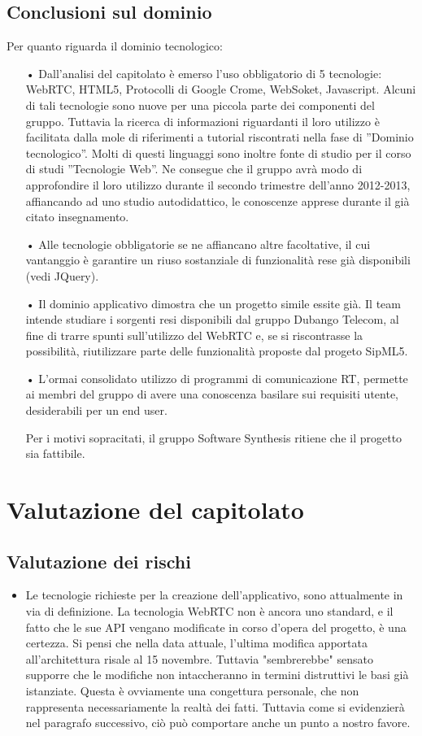 \subsection{Conclusioni sul dominio}
Per quanto riguarda il dominio tecnologico:
\begin{itemize}
	\item[•] Dall'analisi del capitolato è emerso l'uso obbligatorio di 5 tecnologie: WebRTC, HTML5, Protocolli di Google Crome, WebSoket, Javascript. Alcuni di tali tecnologie sono nuove per una piccola parte dei componenti del gruppo. Tuttavia la ricerca di informazioni riguardanti il loro utilizzo è facilitata dalla mole di riferimenti a tutorial riscontrati nella fase di ''Dominio tecnologico''. Molti di questi linguaggi sono inoltre fonte di studio per il corso di studi ''Tecnologie Web''. Ne consegue che il gruppo avrà modo di approfondire il loro utilizzo durante il secondo trimestre dell'anno 2012-2013, affiancando ad uno studio autodidattico, le conoscenze apprese durante il già citato insegnamento.
	\item[•] Alle tecnologie obbligatorie se ne affiancano altre facoltative, il cui vantanggio è garantire un riuso sostanziale di funzionalità rese già disponibili (vedi JQuery).
	\item[•] Il dominio applicativo dimostra che un progetto simile essite già. Il team intende studiare i sorgenti resi disponibili dal gruppo Dubango Telecom, al fine di trarre spunti sull'utilizzo del WebRTC e, se si riscontrasse la possibilità, riutilizzare parte delle funzionalità proposte dal progeto SipML5.
	\item[•] L'ormai consolidato utilizzo di programmi di comunicazione RT, permette ai membri del gruppo di avere una conoscenza basilare sui requisiti utente, desiderabili per un end user.
	
Per i motivi sopracitati, il gruppo Software Synthesis ritiene che il progetto sia fattibile.
\end{itemize}

\section{Valutazione del capitolato}

\subsection{Valutazione dei rischi}
\begin{itemize}
	\item Le tecnologie richieste per la creazione dell'applicativo, sono attualmente in via di definizione. La tecnologia WebRTC non è ancora uno standard, e il fatto che le sue API vengano modificate in corso d'opera del progetto, è una certezza. Si pensi che nella data attuale, l'ultima modifica apportata all'architettura risale al 15 novembre. Tuttavia "sembrerebbe" sensato supporre che le modifiche non intaccheranno in termini distruttivi le basi già istanziate. Questa è ovviamente una congettura personale, che non rappresenta necessariamente la realtà dei fatti. Tuttavia come  si evidenzierà nel paragrafo successivo, ciò può comportare anche un punto a nostro favore.
\end{itemize}

